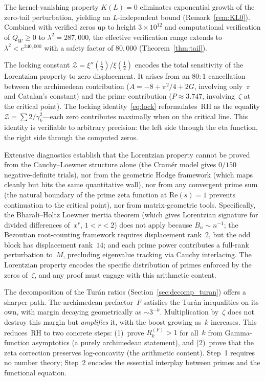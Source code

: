 \documentclass[11pt,a4paper]{article}
\begin{document}
The kernel-vanishing property $K(L) = 0$ eliminates exponential growth of the zero-tail perturbation, yielding an $L$-independent bound (Remark~\ref{rem:KL0}). Combined with verified zeros up to height $3 \times 10^{12}$ and computational verification of $Q_W \geq 0$ to $\lambda^2 = 287{,}000$, the effective verification range extends to $\lambda^2 < e^{240{,}000}$ with a safety factor of $80{,}000$ (Theorem~\ref{thm:tail}).

The locking constant $\mathcal{Z} = \xi''(\tfrac{1}{2})/\xi(\tfrac{1}{2})$ encodes the total sensitivity of the Lorentzian property to zero displacement. It arises from an $80{:}1$ cancellation between the archimedean contribution ($A = -8 + \pi^2/4 + 2G$, involving only~$\pi$ and Catalan's constant) and the prime contribution ($P \approx 3.747$, involving~$\zeta$ at the critical point). The locking identity~\eqref{eq:lock} reformulates~RH as the equality $\mathcal{Z} = \sum 2/\gamma_k^2$---each zero contributes maximally when on the critical line. This identity is verifiable to arbitrary precision: the left side through the eta function, the right side through the computed zeros.

Extensive diagnostics establish that the Lorentzian property cannot be proved from the Cauchy--Loewner structure alone (the Cram\'er model gives $0/150$ negative-definite trials), nor from the geometric Hodge framework (which maps cleanly but hits the same quantitative wall), nor from any convergent prime sum (the natural boundary of the prime zeta function at $\mathrm{Re}(s) = 1$ prevents continuation to the critical point), nor from matrix-geometric tools. Specifically, the Bharali--Holtz Loewner inertia theorem (which gives Lorentzian signature for divided differences of~$x^r$, $1 < r < 2$) does not apply because $B_n \sim n^{-1}$; the Bezoutian root-counting framework requires displacement rank~$2$, but the odd block has displacement rank~$14$; and each prime power contributes a full-rank perturbation to~$M$, precluding eigenvalue tracking via Cauchy interlacing. The Lorentzian property encodes the specific distribution of primes enforced by the zeros of~$\zeta$, and any proof must engage with this arithmetic content.

The decomposition of the Tur\'an ratios (Section~\ref{sec:decomp_turan}) offers a sharper path. The archimedean prefactor~$F$ satisfies the Tur\'an inequalities on its own, with margin decaying geometrically as $\sim 3^{-k}$. Multiplication by~$\zeta$ does not destroy this margin but \emph{amplifies} it, with the boost growing as~$k$ increases. This reduces~RH to two concrete steps: (1)~prove $R_k^{(F)} > 1$ for all~$k$ from Gamma-function asymptotics (a purely archimedean statement), and (2)~prove that the zeta correction preserves log-concavity (the arithmetic content). Step~1 requires no number theory; Step~2 encodes the essential interplay between primes and the functional equation.
\end{document}

